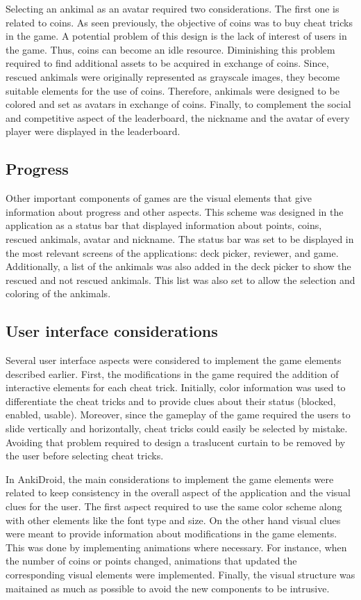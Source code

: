 Selecting an ankimal as an avatar required two considerations. The first one is related to coins. As seen previously, the objective of coins was to buy cheat tricks in the game. A potential problem of this design is the lack of interest of users in the game. Thus, coins can become an idle resource. Diminishing this problem required to find additional assets to be acquired in exchange of coins. Since, rescued ankimals were originally represented as grayscale images, they become suitable elements for the use of coins. Therefore, ankimals were designed to be colored and set as avatars in exchange of coins. Finally, to complement the social and competitive aspect of the leaderboard, the nickname and the avatar of every player were displayed in the leaderboard.

\subsection{Progress}
Other important components of games are the visual elements that give information about progress and other aspects. This scheme was designed in the application as a status bar that displayed information about points, coins, rescued ankimals, avatar and nickname. The status bar was set to be displayed in the most relevant screens of the applications: deck picker, reviewer, and game. Additionally, a list of the ankimals was also added in the deck picker to show the rescued and not rescued ankimals. This list was also set to allow the selection and coloring of the ankimals.


\subsection{User interface considerations}
Several user interface aspects were considered to implement the game elements described earlier. First, the modifications in the game required the addition of interactive elements for each cheat trick. Initially, color information was used to differentiate the cheat tricks and to provide clues about their status (blocked, enabled, usable). Moreover, since the gameplay of the game required the users to slide vertically and horizontally, cheat tricks could easily be selected by mistake. Avoiding that problem required to design a traslucent curtain to be removed by the user before selecting cheat tricks.

In AnkiDroid, the main considerations to implement the game elements were related to keep consistency in the overall aspect of the application and the visual clues for the user. The first aspect required to use the same color scheme along with other elements like the font type and size. On the other hand visual clues were meant to provide information about modifications in the game elements. This was done by implementing animations where necessary. For instance, when the number of coins or points changed, animations that updated the corresponding visual elements were implemented. Finally, the visual structure was maitained as much as possible to avoid the new components to be intrusive.